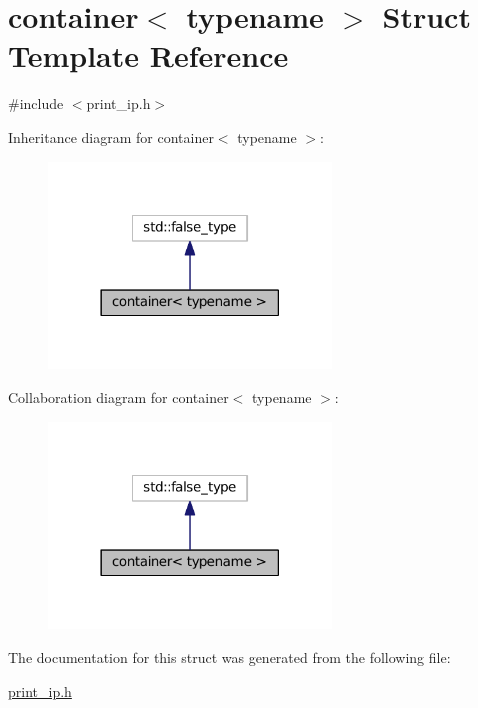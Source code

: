 \hypertarget{structcontainer}{}\section{container$<$ typename $>$ Struct Template Reference}
\label{structcontainer}


{\ttfamily \#include $<$print\+\_\+ip.\+h$>$}



Inheritance diagram for container$<$ typename $>$\+:
\nopagebreak
\begin{figure}[H]
\begin{center}
\leavevmode
\includegraphics[width=213pt]{structcontainer__inherit__graph}
\end{center}
\end{figure}


Collaboration diagram for container$<$ typename $>$\+:
\nopagebreak
\begin{figure}[H]
\begin{center}
\leavevmode
\includegraphics[width=213pt]{structcontainer__coll__graph}
\end{center}
\end{figure}


The documentation for this struct was generated from the following file\+:\begin{DoxyCompactItemize}
\item 
\hyperlink{print__ip_8h}{print\+\_\+ip.\+h}\end{DoxyCompactItemize}
